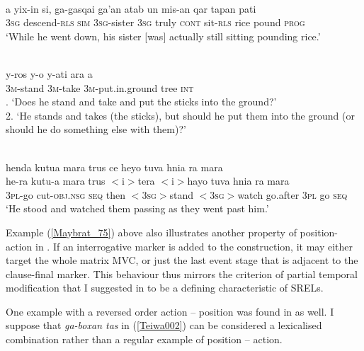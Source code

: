 \ea \label{Teiwa_24}
\\
\gll a yix-in si, ga-gasqai ga'an atab un mis-an qar tapan pati \\
3\textsc{sg} descend-\textsc{rls} \textsc{sim} 3\textsc{sg}-sister 3\textsc{sg} truly \textsc{cont} sit-\textsc{rls} rice pound \textsc{prog} \\
\glft `While he went down, his sister [was] actually still sitting pounding rice.'\\ 
\z

\ea \label{Maybrat_75}
\\
\gll y-ros y-o y-ati ara a \\
3\textsc{m}-stand 3\textsc{m}-take 3\textsc{m}-put.in.ground tree \textsc{int} \\
. `Does he stand and take and put the sticks into the ground?' \\ 2. `He stands and takes (the sticks), but should he put them into the ground (or should he do something else with them)?'\\
\z

\ea \label{WBW016}
\\
\glll henda kutua mara trus ce heyo tuva hnia ra mara \\
he-ra kutu-a mara trus $<$i$>$tera $<$i$>$hayo tuva hnia ra mara \\
\textsc{3}\textsc{pl}-go cut-\textsc{obj}.\textsc{nsg} \textsc{seq} then $<$\textsc{3}\textsc{sg}$>$stand $<$\textsc{3}\textsc{sg}$>$watch go.after \textsc{3}\textsc{pl} go \textsc{seq} \\
\glft `He stood and watched them passing as they went past him.'\\ 
\z

Example (\ref{Maybrat_75}) above also illustrates another property of position-action in . If an interrogative marker is added to the construction, it may either target the whole matrix MVC, or just the last event stage that is adjacent to the clause-final marker. This behaviour thus mirrors the criterion of partial temporal modification that I suggested in  to be a defining characteristic of SRELs.

One example with a reversed order action -- position was found in  as well. I suppose that \textit{ga-boxan tas} in (\ref{Teiwa002}) can be considered a lexicalised combination rather than a regular example of position -- action.

